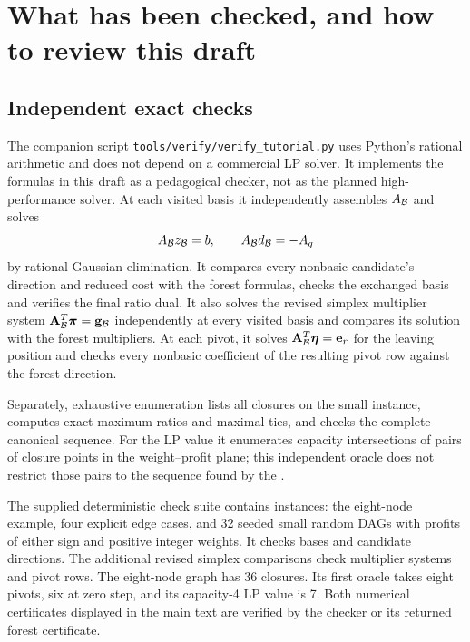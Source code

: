 \section{What has been checked, and how to review this draft}\label{sec:verification}

\subsection{Independent exact checks}
The companion script \texttt{tools/verify/verify\_tutorial.py} uses Python's
rational arithmetic and does not depend on a commercial LP solver. It
implements the formulas in this draft as a pedagogical checker, not as the
planned high-performance solver. At each visited basis it independently
assembles $A_{\mathcal B}$ and solves
\[
 A_{\mathcal B}z_{\mathcal B}=b,\qquad
 A_{\mathcal B}d_{\mathcal B}=-A_q
\]
by rational Gaussian elimination. It compares every nonbasic candidate's
direction and reduced cost with the forest formulas, checks the exchanged
basis and verifies the final ratio dual.
It also solves the revised simplex multiplier system
$\mathbf{A}_{\mathcal B}^T\boldsymbol{\pi}=\mathbf{g}_{\mathcal B}$ independently at every visited basis and compares
its solution with the forest multipliers. At each pivot, it solves
$\mathbf{A}_{\mathcal B}^T\boldsymbol{\eta}=\mathbf{e}_r$ for the leaving position and checks every
nonbasic coefficient of the resulting pivot row against the forest direction.

Separately, exhaustive enumeration lists all closures on the small instance,
computes exact maximum ratios and maximal ties, and checks the complete
canonical sequence. For the LP value it enumerates capacity intersections
of pairs of closure points in the weight--profit plane; this independent
oracle does not restrict those pairs to the sequence found by the \FS{}.


The supplied deterministic check suite contains \VerifiedInstances{} instances:
the eight-node example, four explicit edge cases, and 32 seeded small random
DAGs with profits of either sign and positive integer weights. It checks
\VerifiedBases{} bases and \VerifiedDirections{} candidate directions.
The additional revised simplex comparisons check \VerifiedMultipliers{}
multiplier systems and \VerifiedPivotRows{} pivot rows.
The eight-node graph has 36 closures. Its first oracle takes eight pivots,
six at zero step, and its capacity-4 LP value is 7.
Both numerical certificates displayed in the main text are verified by
the checker or its returned forest certificate.

